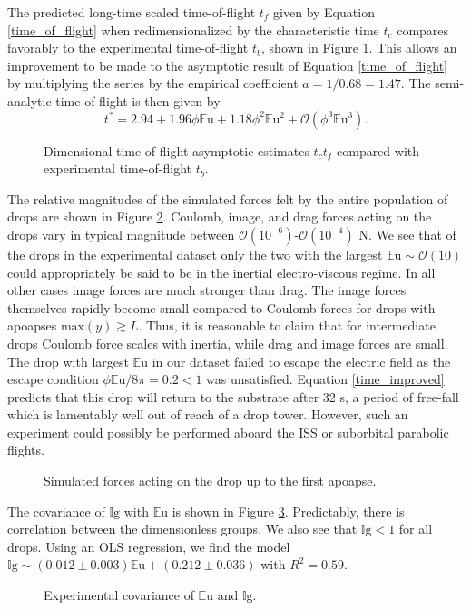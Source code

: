 \documentclass[12pt,a4paper,oneside]{book}
\begin{document}
The predicted long-time scaled time-of-flight $t_f$ given by Equation \ref{time_of_flight} when redimensionalized by the characteristic time $t_c$ compares favorably to the experimental time-of-flight $t_b$, shown in Figure \ref{fig:times2}. This allows an improvement to be made to the asymptotic result of Equation \ref{time_of_flight} by multiplying the series by the empirical coefficient $a = 1/0.68 = 1.47$. The semi-analytic time-of-flight is then given by
\begin{equation}
\label{time_improved}
t^* = 2.94 + 1.96\phi\mathbb{E}\mbox{u} + 1.18\phi^2\mathbb{E}\mbox{u}^{2} + \mathcal{O}(\phi^3\mathbb{E}\mbox{u}^{3}).
\end{equation}
\begin{figure}[htb]
    \centering
    
    \caption{Dimensional time-of-flight asymptotic estimates $t_c t_f$ compared with experimental time-of-flight $t_b$.\label{fig:times2}}
\end{figure}
The relative magnitudes of the simulated forces felt by the entire population of drops are shown in Figure \ref{fig:forces}. Coulomb, image, and drag forces acting on the drops vary in typical magnitude between $\mathcal{O}(10^{-6})$-$\mathcal{O}(10^{-4})$ N. We see that of the drops in the experimental dataset only the two with the largest $\mathbb{E}\mbox{u} \sim \mathcal{O}(10)$ could appropriately be said to be in the inertial electro-viscous regime. In all other cases image forces are much stronger than drag. The image forces themselves rapidly become small compared to Coulomb forces for drops with apoapses $\mbox{max}\left( y\right) \gtrsim L$. Thus, it is reasonable to claim that for intermediate drops Coulomb force scales with inertia, while drag and image forces are small. The drop with largest $\mathbb{E}\mbox{u}$ in our dataset failed to escape the electric field as the escape condition $\phi \mathbb{E}\mbox{u} / 8\pi = 0.2 < 1$ was unsatisfied. Equation \ref{time_improved} predicts that this drop will return to the substrate after 32 s, a period of free-fall which is lamentably well out of reach of a drop tower. However, such an experiment could possibly be performed aboard the ISS or suborbital parabolic flights.
\begin{figure}[!htb]
    \centering
    \resizebox{14cm}{!}{}
    \caption{Simulated forces acting on the drop up to the first apoapse.\label{fig:forces}}
\end{figure}

The covariance of $\mathbb{I}\mbox{g}$ with $\mathbb{E}\mbox{u}$ is shown in Figure \ref{fig:dnumbs}. Predictably, there is correlation between the dimensionless groups. We also see that $\mathbb{I}\mbox{g} < 1$ for all drops. Using an OLS regression, we find the model $\mathbb{I}\mbox{g} \sim (0.012 \pm 0.003) \mathbb{E}\mbox{u} + (0.212 \pm 0.036) $ with $R^2 =0.59$.
\begin{figure}[htb]
    \centering
    
    \caption{Experimental covariance of $\mathbb{E}\mbox{u}$ and $\mathbb{I}\mbox{g}$.\label{fig:dnumbs}}
\end{figure}
  
\end{document}
